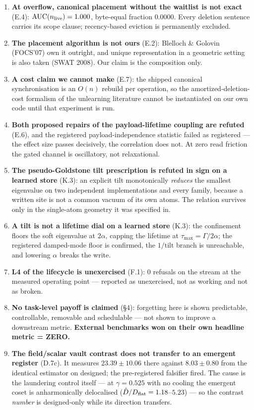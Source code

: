 \documentclass{article}
\begin{document}
\begin{enumerate}
\item \textbf{At overflow, canonical placement without the waitlist is not exact} (E.4): $\mathrm{AUC}(n_{\rm live})=1.000$, byte-equal fraction $0.0000$. Every deletion sentence carries its scope clause; recency-based eviction is permanently excluded.
\item \textbf{The placement algorithm is not ours} (E.2): Blelloch \& Golovin (FOCS'07) own it outright, and unique representation in a geometric setting is also taken (SWAT 2008). Our claim is the composition only.
\item \textbf{A cost claim we cannot make} (E.7): the shipped canonical synchronisation is an $O(n)$ rebuild per operation, so the amortized-deletion-cost formalism of the unlearning literature cannot be instantiated on our own code until that experiment is run.
\item \textbf{Both proposed repairs of the payload-lifetime coupling are refuted} (E.6), and the registered payload-independence statistic failed as registered --- the effect size passes decisively, the correlation does not. At zero read friction the gated channel is oscillatory, not relaxational.
\item \textbf{The pseudo-Goldstone tilt prescription is refuted in sign on a learned store} (K.3): an explicit tilt monotonically \emph{reduces} the smallest eigenvalue on two independent implementations and every family, because a written site is not a common vacuum of its own atoms. The relation survives only in the single-atom geometry it was specified in.
\item \textbf{A tilt is not a lifetime dial on a learned store} (K.3): the confinement floors the soft eigenvalue at $2\alpha$, capping the lifetime at $\tau_{\max}=\Gamma/2\alpha$; the registered damped-mode floor is confirmed, the $1/\text{tilt}$ branch is unreachable, and lowering $\alpha$ breaks the write.
\item \textbf{L4 of the lifecycle is unexercised} (F.1): 0 refusals on the stream at the measured operating point --- reported as unexercised, not as working and not as broken.
\item \textbf{No task-level payoff is claimed} (\S 4): forgetting here is shown predictable, controllable, removable and schedulable --- not shown to improve a downstream metric. \textbf{External benchmarks won on their own headline metric = ZERO.}
\item \textbf{The field/scalar vault contrast does not transfer to an emergent register} (D.7c). It measures $23.39\pm10.06$ there against $8.03\pm0.80$ from the identical estimator on designed; the pre-registered falsifier fired. The cause is the laundering control itself --- at $\gamma=0.525$ with no cooling the emergent coset is anharmonically delocalised ($\hat D/D_{\rm flat}=1.18$--$5.23$) --- so the contrast \emph{number} is designed-only while its direction transfers.

\end{enumerate}
\end{document}

